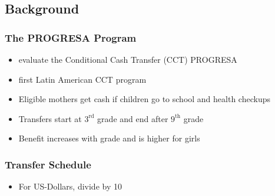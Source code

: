 \documentclass[11pt]{beamer}
\begin{document}
\subsection{Background}

\begin{frame}[c]\frametitle{The PROGRESA Program}
    \begin{itemize}
        \item \cite{Todd2006} evaluate the Conditional Cash Transfer (CCT) PROGRESA
        \item first Latin American CCT program
        \item Eligible mothers get cash if children go to school and health checkups
        \item Transfers start at $3^\text{rd}$ grade and end after $9^\text{th}$ grade
        \item Benefit increases with grade and is higher for girls
    \end{itemize}
\end{frame}



\begin{frame}[c]\frametitle{Transfer Schedule}
\vspace{-0.5cm}
\vspace{1cm}

\begin{itemize}
    \item For US-Dollars, divide by 10
\end{itemize}
\end{frame}
\end{document}
